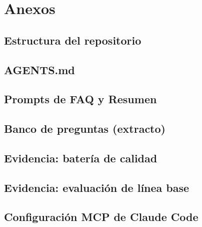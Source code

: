 \chapter{Anexos}\label{cap:anexos}
\section{Estructura del repositorio}
{\scriptsize}

\section{AGENTS.md}


\section{Prompts de FAQ y Resumen}



\section{Banco de preguntas (extracto)}


\section{Evidencia: batería de calidad}


\section{Evidencia: evaluación de línea base}


\section{Configuración MCP de Claude Code}

